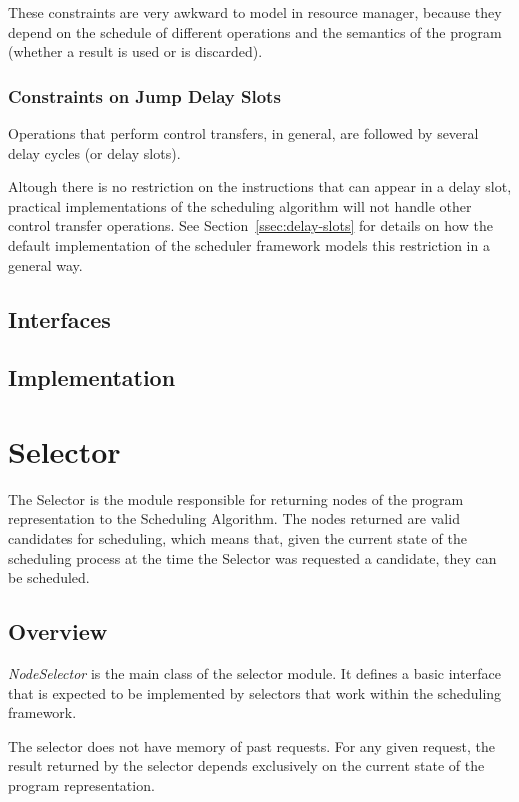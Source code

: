 \documentclass[a4paper,twoside]{tce}
\begin{document}
These constraints are very awkward to model in resource manager, because
they depend on the schedule of different operations and the semantics of the
program (whether a result is used or is discarded).

\subsection{Constraints on Jump Delay Slots}

Operations that perform control transfers, in general, are followed by
several delay cycles (or delay slots).

Altough there is no restriction on the instructions that can appear in a
delay slot, practical implementations of the scheduling algorithm will not
handle other control transfer operations. See Section~\ref{ssec:delay-slots}
for details on how the default implementation of the scheduler framework
models this restriction in a general way.

\section{Interfaces}
\section{Implementation}



\chapter{Selector}

The Selector is the module responsible for returning nodes of the program
representation to the Scheduling Algorithm. The nodes returned are valid
candidates for scheduling, which means that, given the current state of the
scheduling process at the time the Selector was requested a candidate, they
can be scheduled.

\section{Overview}
\label{ssec:scope-overview}

\emph{NodeSelector} is the main class of the selector module. It defines a
basic interface that is expected to be implemented by selectors that work
within the scheduling framework.

The selector does not have memory of past requests. For any given request,
the result returned by the selector depends exclusively on the current state
of the program representation.
\end{document}
